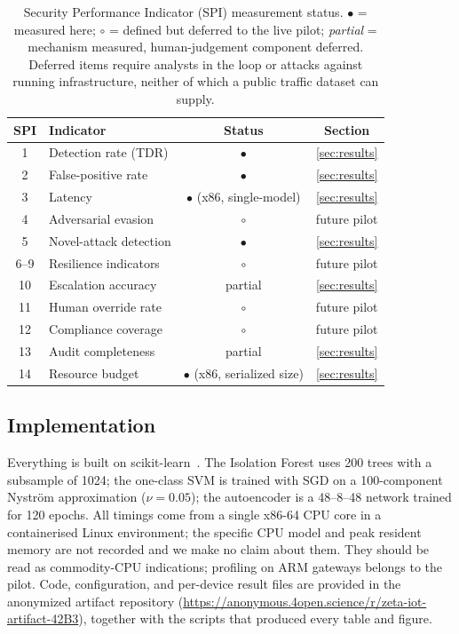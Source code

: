 \documentclass[sigconf,review,anonymous]{acmart}
\begin{document}
\begin{table}[t]
\caption{Security Performance Indicator (SPI) measurement status. $\bullet$ = measured here; $\circ$ = defined but deferred to the live pilot; \emph{partial} = mechanism measured, human-judgement component deferred. Deferred items require analysts in the loop or attacks against running infrastructure, neither of which a public traffic dataset can supply.}
\label{tab:spi}
\small
\begin{tabular}{@{}clcc@{}}
\toprule
SPI & Indicator & Status & Section \\
\midrule
1 & Detection rate (TDR) & $\bullet$ & \ref{sec:results} \\
2 & False-positive rate & $\bullet$ & \ref{sec:results} \\
3 & Latency & $\bullet$ (x86, single-model) & \ref{sec:results} \\
4 & Adversarial evasion & $\circ$ & future pilot \\
5 & Novel-attack detection & $\bullet$ & \ref{sec:results} \\
6--9 & Resilience indicators & $\circ$ & future pilot \\
10 & Escalation accuracy & partial & \ref{sec:results} \\
11 & Human override rate & $\circ$ & future pilot \\
12 & Compliance coverage & $\circ$ & future pilot \\
13 & Audit completeness & partial & \ref{sec:results} \\
14 & Resource budget & $\bullet$ (x86, serialized size) & \ref{sec:results} \\
\bottomrule
\end{tabular}
\end{table}

\subsection{Implementation}
Everything is built on scikit-learn~\cite{sklearn}. The Isolation Forest uses 200 trees with a subsample of 1024; the one-class SVM is trained with SGD on a 100-component Nystr\"om approximation ($\nu{=}0.05$); the autoencoder is a 48--8--48 network trained for 120 epochs. All timings come from a single x86-64 CPU core in a containerised Linux environment; the specific CPU model and peak resident memory are not recorded and we make no claim about them. They should be read as commodity-CPU indications; profiling on ARM gateways belongs to the pilot. Code, configuration, and per-device result files are provided in the anonymized artifact repository (\url{https://anonymous.4open.science/r/zeta-iot-artifact-42B3}), together with the scripts that produced every table and figure.
\end{document}

